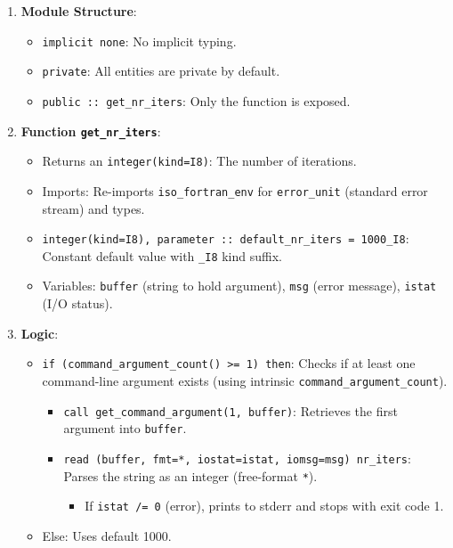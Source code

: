 \begin{enumerate}
\item \textbf{Module Structure}:

\begin{itemize}
\item \texttt{implicit none}: No implicit typing.
\item \texttt{private}: All entities are private by default.
\item \texttt{public :: get\_nr\_iters}: Only the function is exposed.
\end{itemize}


\item \textbf{Function \texttt{get\_nr\_iters}}:

\begin{itemize}
\item Returns an \texttt{integer(kind=I8)}: The number of iterations.
\item Imports: Re-imports \texttt{iso\_fortran\_env} for \texttt{error\_unit} (standard error stream) and types.
\item \texttt{integer(kind=I8), parameter :: default\_nr\_iters = 1000\_I8}: Constant default value with \texttt{\_I8} kind suffix.
\item Variables: \texttt{buffer} (string to hold argument), \texttt{msg} (error message), \texttt{istat} (I/O status).
\end{itemize}


\item \textbf{Logic}:

\begin{itemize}
\item \texttt{if (command\_argument\_count() \textgreater = 1) then}: Checks if at least one command-line argument exists (using intrinsic \texttt{command\_argument\_count}).

\begin{itemize}
\item \texttt{call get\_command\_argument(1, buffer)}: Retrieves the first argument into \texttt{buffer}.
\item \texttt{read (buffer, fmt=*, iostat=istat, iomsg=msg) nr\_iters}: Parses the string as an integer (free-format \texttt{*}).

\begin{itemize}
\item If \texttt{istat /= 0} (error), prints to stderr and stops with exit code 1.
\end{itemize}
\end{itemize}


\item Else: Uses default 1000.
\end{itemize}
\end{enumerate}

